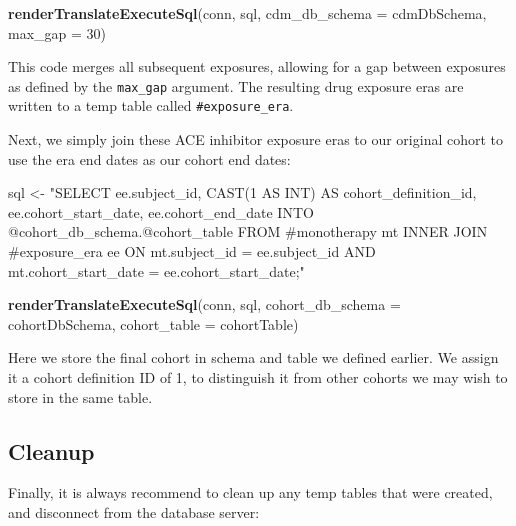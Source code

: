 \documentclass[11pt]{book}
\newenvironment{Shaded}{\begin{snugshade}}{\end{snugshade}}
\newcommand{\KeywordTok}[1]{\textcolor[rgb]{0.13,0.29,0.53}{\textbf{#1}}}
\newcommand{\DataTypeTok}[1]{\textcolor[rgb]{0.13,0.29,0.53}{#1}}
\newcommand{\DecValTok}[1]{\textcolor[rgb]{0.00,0.00,0.81}{#1}}
\newcommand{\StringTok}[1]{\textcolor[rgb]{0.31,0.60,0.02}{#1}}
\newcommand{\NormalTok}[1]{#1}
\theoremstyle{definition}
\theoremstyle{definition}
\theoremstyle{definition}
\theoremstyle{remark}
\begin{document}
\begin{Shaded}
\begin{Highlighting}[]
\KeywordTok{renderTranslateExecuteSql}\NormalTok{(conn,}
\NormalTok{                          sql, }
                          \DataTypeTok{cdm_db_schema =}\NormalTok{ cdmDbSchema,}
                          \DataTypeTok{max_gap =} \DecValTok{30}\NormalTok{)}
\end{Highlighting}
\end{Shaded}

This code merges all subsequent exposures, allowing for a gap between
exposures as defined by the \texttt{max\_gap} argument. The resulting
drug exposure eras are written to a temp table called
\texttt{\#exposure\_era}.

Next, we simply join these ACE inhibitor exposure eras to our original
cohort to use the era end dates as our cohort end dates:

\begin{Shaded}
\begin{Highlighting}[]
\NormalTok{sql <-}\StringTok{ "SELECT ee.subject_id,}
\StringTok{  CAST(1 AS INT) AS cohort_definition_id,}
\StringTok{  ee.cohort_start_date,}
\StringTok{  ee.cohort_end_date}
\StringTok{INTO @cohort_db_schema.@cohort_table}
\StringTok{FROM #monotherapy mt}
\StringTok{INNER JOIN #exposure_era ee}
\StringTok{  ON mt.subject_id = ee.subject_id}
\StringTok{    AND mt.cohort_start_date = ee.cohort_start_date;"}

\KeywordTok{renderTranslateExecuteSql}\NormalTok{(conn, }
\NormalTok{                          sql, }
                          \DataTypeTok{cohort_db_schema =}\NormalTok{ cohortDbSchema, }
                          \DataTypeTok{cohort_table =}\NormalTok{ cohortTable)}
\end{Highlighting}
\end{Shaded}

Here we store the final cohort in schema and table we defined earlier.
We assign it a cohort definition ID of 1, to distinguish it from other
cohorts we may wish to store in the same table.

\subsection{Cleanup}\label{cleanup}

Finally, it is always recommend to clean up any temp tables that were
created, and disconnect from the database server:
\end{document}

